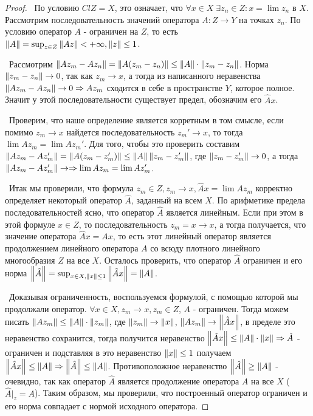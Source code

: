 \begin{proof}
\smallskip
\par\noindent\textbullet~По условию $Cl Z = X$, это означает, что $\forall x \in X \; \exists z_n \in Z : x = \lim z_n$ в $X$. Рассмотрим последовательность значений 
оператора $A : Z \to Y$ на точках $z_n$. По условию оператор $A$ - ограничен на $Z$, то есть $\left\lVert A\right\rVert = \sup_{z \in Z} \left\lVert A z\right\rVert < + \infty, \left\lVert z\right\rVert \le 1$.

\smallskip
\noindent\textbullet~Рассмотрим $\left\lVert A z_m - A z_n\right\rVert = \left\lVert A (z_m - z_n)\right\rVert \le \left\lVert A\right\rVert \cdot \left\lVert z_m - z_n\right\rVert$. Норма $\left\lVert z_m - z_n\right\rVert \to 0$, так как $z_m \to x$, а 
тогда из написанного неравенства $\left\lVert A z_m - A z_n\right\rVert \to 0 \Rightarrow A z_m $ сходится в себе в пространстве $Y$, которое полное. Значит у этой последовательности 
существует предел, обозначим его $\hat{A}x$. 

\smallskip
\noindent\textbullet~Проверим, что наше определение является корретным в том смысле, если помимо $z_m \to x$ найдется последовательность $z_m' \to 
x$, то тогда $\lim A z_m = \lim A z_m'$. Для того, чтобы это проверить составим $\left\lVert A z_m - A z_m'\right\rVert = \left\lVert A (z_m - z_m')\right\rVert \le \left\lVert A\right\rVert \left\lVert z_m - z_m'\right\rVert$, где 
$\left\lVert z_m - z_m'\right\rVert \to 0$, а тогда $\left\lVert A z_m - A z_m'\right\rVert \to \Rightarrow \lim A z_m = \lim A z_m'$.

\smallskip
\noindent\textbullet~Итак мы проверили, что формула $z_m \in Z, z_m \to x, \hat{A} x = \lim A z_m$ корректно определяет некоторый оператор $\hat{A}$, заданный на всем $X$.
По арифметике предела последовательностей ясно, что оператор $\hat{A}$ является линейным. Если при этом в этой формуле $x \in Z$, то последовательность $z_m = x \to x$, 
а тогда получается, что значение оператора $\hat{A} x = A x$, то есть этот линейный оператор является продолжением линейного оператора $A$ со всюду плотного линейного 
многообразия $Z$ на все $X$. Осталось проверить, что оператор $\hat{A}$ ограничен и его норма $\left\lVert\hat{A}\right\rVert = \sup_{x \in X, \left\lVert x\right\rVert \le 1} \left\lVert\hat{A} x\right\rVert 
= \left\lVert A\right\rVert$.

\medskip
\noindent\textbullet~Доказывая ограниченность, воспользуемся формулой, с помощью которой мы продолжали оператор. $\forall x \in X, z_m \to x, z_m \in Z$, $A$ - ограничен.
Тогда можем писать $\left\lVert A z_m\right\rVert \le \left\lVert A\right\rVert \cdot \left\lVert z_m\right\rVert$, где $\left\lVert z_m\right\rVert \to \left\lVert x\right\rVert$, $\left\lVert A z_m\right\rVert \to \left\lVert\hat{A}x\right\rVert$, в пределе это неравенство сохранится, 
тогда получится неравенство $\left\lVert\hat{A} x\right\rVert \le \left\lVert A\right\rVert \cdot \left\lVert x\right\rVert \Rightarrow \hat{A}$ - ограничен и подставляя в это неравенство $\left\lVert x\right\rVert \le 1$ получаем 
$\left\lVert\hat{A} x \right\rVert \le \left\lVert A\right\rVert \Rightarrow \left\lVert\hat{A}\right\rVert \le \left\lVert A\right\rVert$. Противоположное неравенство $\left\lVert\hat{A}\right\rVert \ge \left\lVert A\right\rVert$ - очевидно, так как оператор $\hat{A}$ 
является продолжение оператора $A$ на все $X$ ($\hat{A}\big|_z = A$). Таким образом, мы проверили, что построенный оператор ограничен и его норма совпадает с нормой 
исходного оператора. 


\end{proof}
